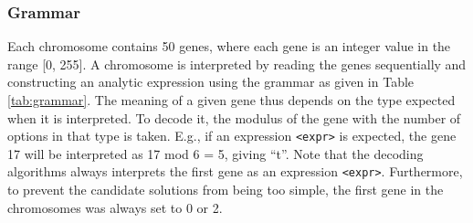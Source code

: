 \documentclass[multicolumn, 12pt]{extarticle}
\begin{document}
\subsubsection{Grammar}
Each chromosome contains 50 genes, where each gene is an integer value in the range [0, 255]. A chromosome is interpreted by reading the genes sequentially and constructing an analytic expression using the grammar as given in Table \ref{tab:grammar}.  The meaning of a given gene thus depends on the type expected when it is interpreted. To decode it, the modulus of the gene with the number of options in that type is taken. E.g., if an expression \texttt{<expr>} is expected, the gene 17 will be interpreted as 17 mod 6 = 5, giving ``t''. Note that the decoding algorithms always interprets the first gene as an expression \texttt{<expr>}.  Furthermore, to prevent the candidate solutions from being too simple, the first gene in the chromosomes was always set to 0 or 2.
\end{document}
